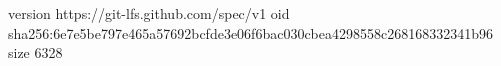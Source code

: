 version https://git-lfs.github.com/spec/v1
oid sha256:6e7e5be797e465a57692bcfde3e06f6bac030cbea4298558c268168332341b96
size 6328

